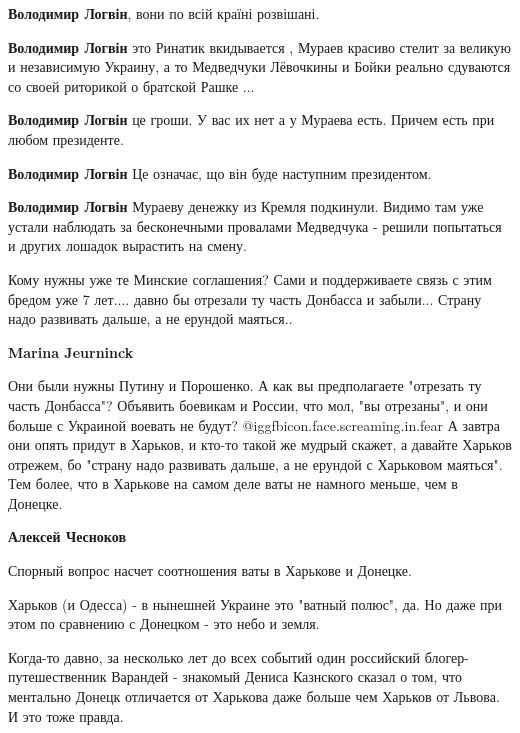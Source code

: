 \begin{itemize}
\begin{itemize} %
\textbf{Володимир Логвін}, вони по всій країні розвішані.

\textbf{Володимир Логвін} это Ринатик вкидывается , Мураев красиво стелит за великую и независимую Украину, а то Медведчуки Лёвочкины и Бойки реально сдуваются со своей риторикой о братской Рашке ...

\textbf{Володимир Логвін} це гроши. У вас их нет а у Мураева есть. Причем есть при любом президенте.

\textbf{Володимир Логвін} Це означає, що він буде наступним президентом.

\textbf{Володимир Логвін} Мураеву денежку из Кремля подкинули. Видимо там уже устали наблюдать за бесконечными провалами Медведчука - решили попытаться и других лошадок вырастить на смену.
\end{itemize} %


Кому нужны уже те Минские соглашения? Сами и поддерживаете связь с этим бредом
уже 7 лет.... давно бы отрезали ту часть Донбасса и забыли... Страну надо
развивать дальше, а не ерундой маяться..

\begin{itemize} %
\textbf{Marina Jeurninck} 

Они были нужны Путину и Порошенко. А как вы предполагаете "отрезать ту часть
Донбасса"? Объявить боевикам и России, что мол, "вы отрезаны", и они больше с
Украиной воевать не будут?  @igg{fbicon.face.screaming.in.fear}  А завтра они
опять придут в Харьков, и кто-то такой же мудрый скажет, а давайте Харьков
отрежем, бо "страну надо развивать дальше, а не ерундой с Харьковом маяться".
Тем более, что в Харькове на самом деле ваты не намного меньше, чем в Донецке.


\textbf{Алексей Чесноков} 

Спорный вопрос насчет соотношения ваты в Харькове и Донецке.

Харьков (и Одесса) - в нынешней Украине это "ватный полюс", да. Но даже при
этом по сравнению с Донецком - это небо и земля.

Когда-то давно, за несколько лет до всех событий один российский
блогер-путешественник Варандей - знакомый Дениса Казнского сказал о том, что
ментально Донецк отличается от Харькова даже больше чем Харьков от Львова. И
это тоже правда.



\end{itemize}
\end{itemize}
